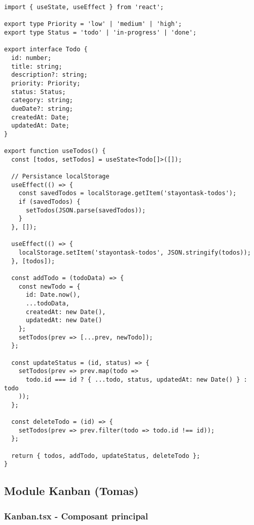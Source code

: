\documentclass[12pt,a4paper]{article}
\begin{document}
\begin{lstlisting}[caption=useTodos.ts - Logique de gestion (Andre)]
import { useState, useEffect } from 'react';

export type Priority = 'low' | 'medium' | 'high';
export type Status = 'todo' | 'in-progress' | 'done';

export interface Todo {
  id: number;
  title: string;
  description?: string;
  priority: Priority;
  status: Status;
  category: string;
  dueDate?: string;
  createdAt: Date;
  updatedAt: Date;
}

export function useTodos() {
  const [todos, setTodos] = useState<Todo[]>([]);

  // Persistance localStorage
  useEffect(() => {
    const savedTodos = localStorage.getItem('stayontask-todos');
    if (savedTodos) {
      setTodos(JSON.parse(savedTodos));
    }
  }, []);

  useEffect(() => {
    localStorage.setItem('stayontask-todos', JSON.stringify(todos));
  }, [todos]);

  const addTodo = (todoData) => {
    const newTodo = {
      id: Date.now(),
      ...todoData,
      createdAt: new Date(),
      updatedAt: new Date()
    };
    setTodos(prev => [...prev, newTodo]);
  };

  const updateStatus = (id, status) => {
    setTodos(prev => prev.map(todo => 
      todo.id === id ? { ...todo, status, updatedAt: new Date() } : todo
    ));
  };

  const deleteTodo = (id) => {
    setTodos(prev => prev.filter(todo => todo.id !== id));
  };

  return { todos, addTodo, updateStatus, deleteTodo };
}
\end{lstlisting}

\subsection{Module Kanban (Tomas)}

\subsubsection{Kanban.tsx - Composant principal}
\end{document}
